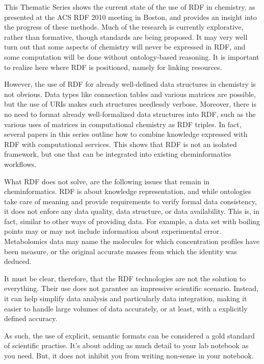 \documentclass[10pt]{bmc_article}
\newenvironment{bmcformat}{\begin{raggedright}\baselineskip20pt\sloppy\setboolean{publ}{false}}{\end{raggedright}\baselineskip20pt\sloppy}
\begin{document}
\begin{bmcformat}
This Thematic Series shows the current state of the use of RDF in
chemistry, as presented at the ACS RDF 2010 meeting in Boston, and provides an
insight into the progress of these methods. Much of the research is currently explorative,
rather than formative, though standards are being proposed.
It may very well turn out that some aspects of chemistry will never be expressed
in RDF, and some computation will be done without ontology-based reasoning. It is important
to realize here where RDF is positioned, namely for linking resources.

However, the use of RDF for already well-defined data structures in chemistry
is not obvious. Data types like connection tables and various matrices are possible, 
but the use of URIs makes such structures needlessly verbose.
Moreover, there is no need to format already well-formalized data structures into
RDF, such as the various uses of matrices in computational chemistry as
RDF triples.
In fact, several papers in this series outline how to
combine knowledge expressed with RDF with computational services.
This shows that RDF is not an isolated framework, but one that can be
integrated into existing cheminformatics workflows.

What RDF does not solve, are the following issues that remain in
cheminformatics. RDF is about knowledge representation, and while
ontologies take care of meaning and provide requirements to verify formal data consistency, 
it does not enfore any data quality, data structure, or data availability. 
This is, in fact, similar to other
ways of providing data. For example, a data set with boiling points
may or may not include information about experimental error.
Metabolomics data may name the molecules for which concentration
profiles have been measure, or the original accurate masses from
which the identity was deduced.


It must be clear, therefore, that the RDF technologies are not the solution
to everything. Their use does not garantee an impressive scientific
scenario. Instead, it can help simplify data analysis and particularly
data integration, making it easier to handle large volumes of
data accurately, or at least, with a explicitly defined accuracy.

As such, the use of explicit, semantic formats can be considered
a gold standard of scientific practise. It's about adding as much detail
to your lab notebook as you need. But, it does not inhibit you
from writing non-sense in your notebook.


\end{bmcformat}
\end{document}
